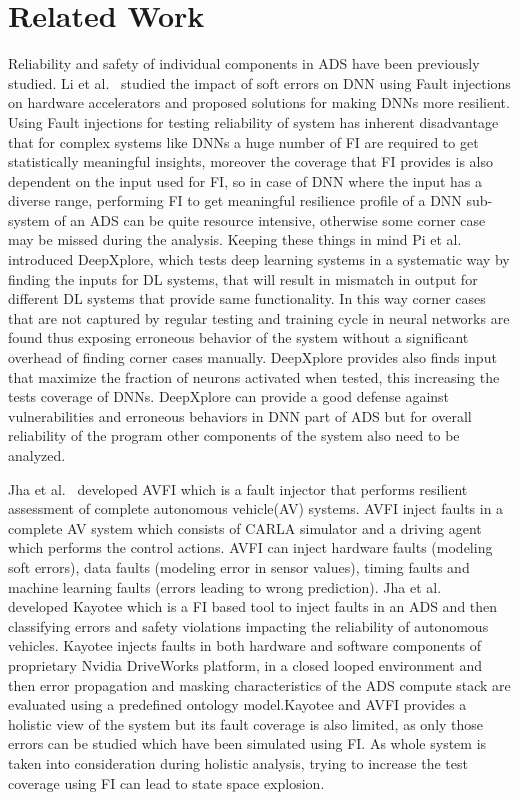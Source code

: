 \section{Related Work} \label{related_work}

Reliability and safety of individual components in ADS have been previously studied. Li et al.~\cite{guanpeng17sc} studied the impact of soft errors on DNN using Fault injections on hardware accelerators and proposed solutions for making DNNs more resilient. Using Fault injections for testing reliability of system has inherent disadvantage that for complex systems like DNNs a huge number of FI are required to get statistically meaningful insights, moreover the coverage that FI provides is also dependent on the input used for FI, so in case of DNN where the input has a diverse range, performing FI to get meaningful resilience profile of a DNN sub-system of an ADS can be quite resource intensive, otherwise some corner case may be missed during the analysis. Keeping these things in mind Pi et al.~\cite{kexin17sosp} introduced DeepXplore, which tests deep learning systems in a systematic way by finding the inputs for DL systems, that will result in mismatch in output for different DL systems that provide same functionality. In this way corner cases that are not captured by regular testing and training cycle in neural networks are found thus exposing erroneous behavior of the system without a significant overhead of finding corner cases manually. DeepXplore provides also finds input that maximize the fraction of neurons activated when tested, this increasing the tests coverage of DNNs. DeepXplore can provide a good defense against vulnerabilities and erroneous behaviors in DNN part of ADS but for overall reliability of the program other components of the system also need to be analyzed.

Jha et al.~\cite{jha18dsn} developed AVFI which is a fault injector that performs resilient assessment of complete autonomous vehicle(AV) systems. AVFI inject faults in a complete AV system which consists of CARLA simulator and a driving agent which performs the control actions. AVFI can inject hardware faults (modeling soft errors), data faults (modeling error in sensor values), timing faults and machine learning faults (errors leading to wrong prediction). Jha et al.~\cite{jha18art} developed Kayotee which is a FI based tool to inject faults in an ADS and then classifying errors and safety violations impacting the reliability of autonomous vehicles. Kayotee injects faults in both hardware and software components of proprietary Nvidia DriveWorks platform, in a closed looped environment and then error propagation and masking characteristics of the ADS compute stack are evaluated using a predefined ontology model.Kayotee and AVFI provides a holistic view of the system but its  fault coverage is also limited, as only those errors can be studied which have been simulated using FI. As whole system is taken into consideration during holistic analysis, trying to increase the test coverage using FI can lead to state space explosion.  